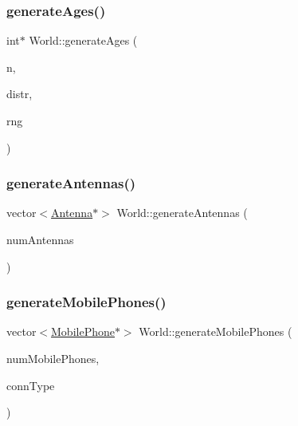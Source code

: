 \mbox{\label{class_world_aa52f524e1a9116a948906592aa927285}} 
\subsubsection{\texorpdfstring{generate\+Ages()}{generateAges()}}
{\footnotesize\ttfamily int$\ast$ World\+::generate\+Ages (\begin{DoxyParamCaption}\item[{int}]{n,  }\item[{shared\+\_\+ptr$<$ \hyperlink{class_age_distribution}{Age\+Distribution} $>$}]{distr,  }\item[{\hyperlink{class_random_number_generator}{Random\+Number\+Generator} $\ast$}]{rng }\end{DoxyParamCaption})\hspace{0.3cm}{\ttfamily [private]}}

\mbox{\label{class_world_adbd58c8093be1ac349d929d9a4bc2ab0}} 
\subsubsection{\texorpdfstring{generate\+Antennas()}{generateAntennas()}}
{\footnotesize\ttfamily vector$<$\hyperlink{class_antenna}{Antenna}$\ast$$>$ World\+::generate\+Antennas (\begin{DoxyParamCaption}\item[{unsigned long}]{num\+Antennas }\end{DoxyParamCaption})\hspace{0.3cm}{\ttfamily [private]}}

\mbox{\label{class_world_a9ba6bd08d85c5f610ea30bf4f74b925d}} 
\subsubsection{\texorpdfstring{generate\+Mobile\+Phones()}{generateMobilePhones()}}
{\footnotesize\ttfamily vector$<$\hyperlink{class_mobile_phone}{Mobile\+Phone}$\ast$$>$ World\+::generate\+Mobile\+Phones (\begin{DoxyParamCaption}\item[{int}]{num\+Mobile\+Phones,  }\item[{\hyperlink{class_holdable_agent_ae2c334b004d7b9c5a999cf2618e4e518}{Holdable\+Agent\+::\+C\+O\+N\+N\+E\+C\+T\+I\+O\+N\+\_\+\+T\+Y\+PE}}]{conn\+Type }\end{DoxyParamCaption})\hspace{0.3cm}{\ttfamily [private]}}

